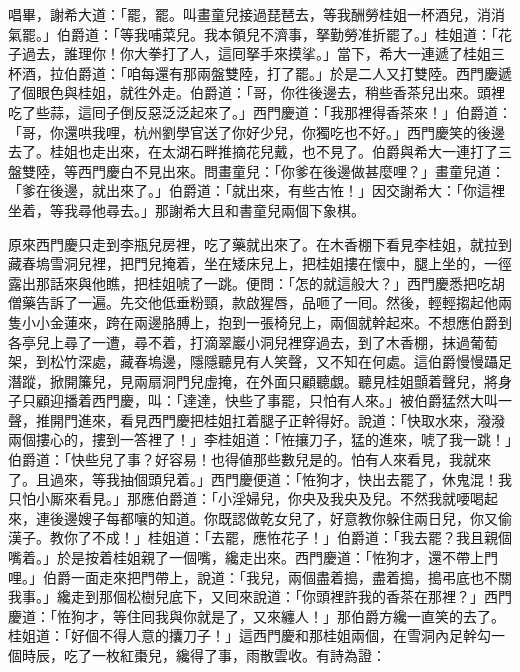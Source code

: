 唱畢，謝希大道：「罷，罷。叫畫童兒接過琵琶去，等我酬勞桂姐一杯酒兒，消消氣罷。」{}伯爵道：「等我哺菜兒。我本領兒不濟事，拏勤勞准折罷了。」桂姐道：「花子過去，誰理你！你大拳打了人，這囘拏手來摸挲。」當下，希大一連遞了桂姐三杯酒，拉伯爵道：「咱每還有那兩盤雙陸，打了罷。」於是二人又打雙陸。西門慶遞了個眼色與桂姐，就徃外走。伯爵道：「哥，你徃後邊去，稍些香茶兒出來。頭裡吃了些蒜，這囘子倒反惡泛泛起來了。」西門慶道：「我那裡得香茶來！」伯爵道：「哥，你還哄我哩，杭州劉學官送了你好少兒，你獨吃也不好。」西門慶笑的後邊去了。桂姐也走出來，在太湖石畔推摘花兒戴，也不見了。伯爵與希大一連打了三盤雙陸，等西門慶白不見出來。問畫童兒：「你爹在後邊做甚麼哩？」畫童兒道：「爹在後邊，就出來了。」伯爵道：「就出來，有些古恠！」因交謝希大：「你這裡坐着，等我尋他尋去。」那謝希大且和書童兒兩個下象棋。

原來西門慶只走到李瓶兒房裡，吃了藥就出來了。在木香棚下看見李桂姐，就拉到藏春塢雪洞兒裡，把門兒掩着，坐在矮床兒上，把桂姐摟在懷中，腿上坐的，一徑露出那話來與他瞧，把桂姐唬了一跳。便問：「怎的就這般大？」西門慶悉把吃胡僧藥告訴了一遍。先交他低垂粉頸，款啟猩唇，品咂了一囘。然後，輕輕搊起他兩隻小小金蓮來，跨在兩邊胳膊上，抱到一張椅兒上，兩個就幹起來。不想應伯爵到各亭兒上尋了一遭，尋不着，打滴翠巖小洞兒裡穿過去，到了木香棚，抹過葡萄架，到松竹深處，藏春塢邊，隱隱聽見有人笑聲，又不知在何處。這伯爵慢慢躡足潛蹤，掀開簾兒，見兩扇洞門兒虛掩，在外面只顧聽覷。聽見桂姐顫着聲兒，將身子只顧迎播着西門慶，叫：「達達，快些了事罷，只怕有人來。」被伯爵猛然大叫一聲，推開門進來，看見西門慶把桂姐扛着腿子正幹得好。說道：「快取水來，潑潑兩個摟心的，摟到一答裡了！」李桂姐道：「恠攘刀子，猛的進來，唬了我一跳！」伯爵道：「快些兒了事？好容易！也得値那些數兒是的。怕有人來看見，我就來了。且過來，等我抽個頭兒着。」{}西門慶便道：「恠狗才，快出去罷了，休鬼混！我只怕小厮來看見。」那應伯爵道：「小淫婦兒，你央及我央及兒。不然我就喓喝起來，連後邊嫂子每都嚷的知道。你既認做乾女兒了，好意教你躲住兩日兒，你又偷漢子。教你了不成！」桂姐道：「去罷，應恠花子！」伯爵道：「我去罷？我且親個嘴着。」於是按着桂姐親了一個嘴，纔走出來。西門慶道：「恠狗才，還不帶上門哩。」伯爵一面走來把門帶上，說道：「我兒，兩個盡着搗，盡着搗，搗弔底也不關我事。」纔走到那個松樹兒底下，又囘來說道：{}「你頭裡許我的香茶在那裡？」西門慶道：「恠狗才，等住囘我與你就是了，又來纏人！」那伯爵方纔一直笑的去了。桂姐道：「好個不得人意的攮刀子！」這西門慶和那桂姐兩個，在雪洞內足幹勾一個時辰，吃了一枚紅棗兒，纔得了事，雨散雲收。有詩為證：

